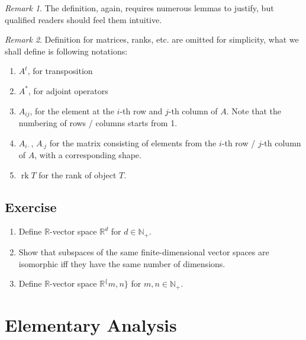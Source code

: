 \documentclass{book}
\theoremstyle{definition}\newtheorem{mechanism}{Mechanism}
\theoremstyle{remark}\newtheorem*{remark}{Remark}
\DeclareMathOperator*{\rank}{rk}
\begin{document}
\begin{remark}
	The definition, again, requires numerous lemmas to justify, but qualified readers should feel them intuitive.
\end{remark}

\begin{remark}
	Definition for matrices, ranks, etc. are omitted for simplicity, what we shall define is following notations:
	
	\begin{enumerate}
		\item $A^t$, for transposition
		\item $A^*$, for adjoint operators
		\item $A_{ij}$, for the element at the $i$-th row and $j$-th column of $A$. Note that the numbering of rows / columns starts from 1.
		\item $A_{i\cdot}$, $A_{\cdot j}$ for the matrix consisting of elements from the $i$-th row / $j$-th column of $A$, with a corresponding shape.
		\item $\rank{T}$ for the rank of object $T$. 
	\end{enumerate}
\end{remark}

\subsection*{Exercise}

\begin{enumerate}
	\item Define $\mathbb R$-vector space $\mathbb R^d$ for $d\in \mathbb N_+$.
	\item Show that subspaces of the same finite-dimensional vector spaces are isomorphic iff they have the same number of dimensions.
	\item Define $\mathbb R$-vector space $\mathbb R^\{m, n\}$ for $m, n\in\mathbb N_+$.
\end{enumerate}

\section{Elementary Analysis}
\end{document}

